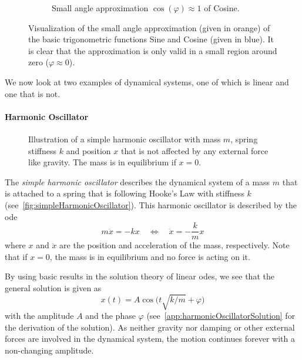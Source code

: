 \begin{figure}
\begin{subfigure}[t]{0.5\linewidth}
			\caption{Small angle approximation \( \cos(\varphi) \approx 1 \) of Cosine.}
		\end{subfigure}
		\caption{Visualization of the small angle approximation (given in orange) of the basic trigonometric functions Sine and Cosine (given in blue). It is clear that the approximation is only valid in a small region around zero (\( \varphi \approx 0 \)).}
		\label{fig:smallAngleApproximation}
	\end{figure}

	We now look at two examples of dynamical systems, one of which is linear and one that is not.

	\paragraph{Harmonic Oscillator}
		\label{subsec:harmonicOscillator}

		\begin{figure}
			\centering
			\tikzHarmonicOscillator
			\caption{Illustration of a simple harmonic oscillator with mass \(m\), spring stiffness \(k\) and position \(x\) that is not affected by any external force like gravity. The mass is in equilibrium if \( x = 0 \).}
			\label{fig:simpleHarmonicOscillator}
		\end{figure}

		The \emph{simple harmonic oscillator} describes the dynamical system of a mass \(m\) that is attached to a spring that is following Hooke's Law with stiffness \(k\) (see~\autoref{fig:simpleHarmonicOscillator}). This harmonic oscillator is described by the \ac{ode}
		\begin{equation}
			m\ddot{x} = -kx \quad\iff\quad \ddot{x} = -\frac{k}{m} x  \label{eq:harmonicOscillator}
		\end{equation}
		where \(x\) and \(\ddot{x}\) are the position and acceleration of the mass, respectively. Note that if \( x = 0 \), the mass is in equilibrium and no force is acting on it.

		By using basic results in the solution theory of linear \acp{ode}, we see that the general solution is given as
		\begin{equation*}
			x(t) = A \cos\Big(t \sqrt{k / m} + \varphi\Big)
		\end{equation*}
		with the amplitude \(A\) and the phase \(\varphi\) (see~\autoref{app:harmonicOscillatorSolution} for the derivation of the solution). As neither gravity nor damping or other external forces are involved in the dynamical system, the motion continues forever with a non-changing amplitude.

